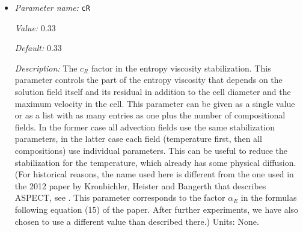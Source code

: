\begin{itemize}
{\it Description:} The $\beta$ factor in the artificial viscosity stabilization. This parameter controls the maximum dissipation of the entropy viscosity, which is the part that only scales with the cell diameter and the maximum velocity in the cell, but does not depend on the solution field itself or its residual. An appropriate value for 2d is 0.078 and 0.117 for 3d. (For historical reasons, the name used here is different from the one used in the 2012 paper by Kronbichler, Heister and Bangerth that describes ASPECT, see \cite{KHB12}. This parameter can be given as a single value or as a list with as many entries as one plus the number of compositional fields. In the former case all advection fields use the same stabilization parameters, in the latter case each field (temperature first, then all compositions) use individual parameters. This can be useful to reduce the stabilization for the temperature, which already has some physical diffusion. This parameter corresponds to the factor $\alpha_{\text{max}}$ in the formulas following equation (15) of the paper. After further experiments, we have also chosen to use a different value than described there: It can be chosen as stated there for uniformly refined meshes, but it needs to be chosen larger if the mesh has cells that are not squares or cubes.) Units: None.


{\it Possible values:} A list of 0 to 4294967295 elements where each element is [A floating point number $v$ such that $0 \leq v \leq \text{MAX\_DOUBLE}$]
\item {\it Parameter name:} {\tt cR}
\label{parameters:Discretization/Stabilization parameters/cR}
\label{parameters:Discretization/Stabilization_20parameters/cR}


{\it Value:} 0.33


{\it Default:} 0.33


{\it Description:} The $c_R$ factor in the entropy viscosity stabilization. This parameter controls the part of the entropy viscosity that depends on the solution field itself and its residual in addition to the cell diameter and the maximum velocity in the cell. This parameter can be given as a single value or as a list with as many entries as one plus the number of compositional fields. In the former case all advection fields use the same stabilization parameters, in the latter case each field (temperature first, then all compositions) use individual parameters. This can be useful to reduce the stabilization for the temperature, which already has some physical diffusion. (For historical reasons, the name used here is different from the one used in the 2012 paper by Kronbichler, Heister and Bangerth that describes ASPECT, see \cite{KHB12}. This parameter corresponds to the factor $\alpha_E$ in the formulas following equation (15) of the paper. After further experiments, we have also chosen to use a different value than described there.) Units: None.



\end{itemize}
